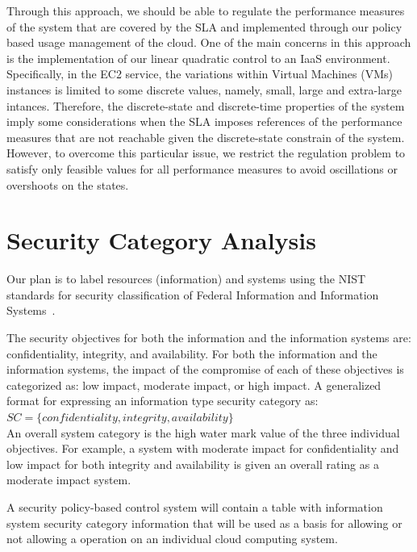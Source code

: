 \documentclass{sig-alternate}
\begin{document}
Through this approach, we should be able to regulate the performance measures of the system that are covered by the
SLA and implemented through our policy based usage management of the cloud. One of the main concerns in this approach is the
implementation of our linear quadratic control to an IaaS environment. 
Specifically, in the EC2 service, the variations within Virtual Machines (VMs) instances
is limited to some discrete values, namely, small, large and extra-large intances. Therefore, the discrete-state and
discrete-time properties of the system imply some considerations when the SLA imposes references of the 
performance measures that are not reachable given the discrete-state constrain of the system. However, to overcome 
this particular issue, we restrict the regulation problem to satisfy only feasible values for all performance measures to
avoid oscillations or overshoots on the states.

\section{Security Category Analysis}
Our plan is to label resources (information) and systems using the NIST standards for security classification of Federal Information and Information Systems~\cite{FIPS199}.

The security objectives for both the information and the information systems are: confidentiality, integrity, and availability.  For both the information and the information systems, the impact of the compromise of each of these objectives is categorized as: low impact, moderate impact, or high impact.  A generalized format for expressing an information type security category as:
\newline
\newline
\begin{math}
SC= \{confidentiality,integrity,availability\}
\end{math}
\\

An overall system category is the high water mark value of the three individual objectives.  For example, a system with moderate impact for confidentiality and low impact for both integrity and availability is given an overall rating as a moderate impact system.

A security policy-based control system will contain a table with information system security category information that will be used as a basis for allowing or not allowing a operation on an individual cloud computing system.
\end{document}
